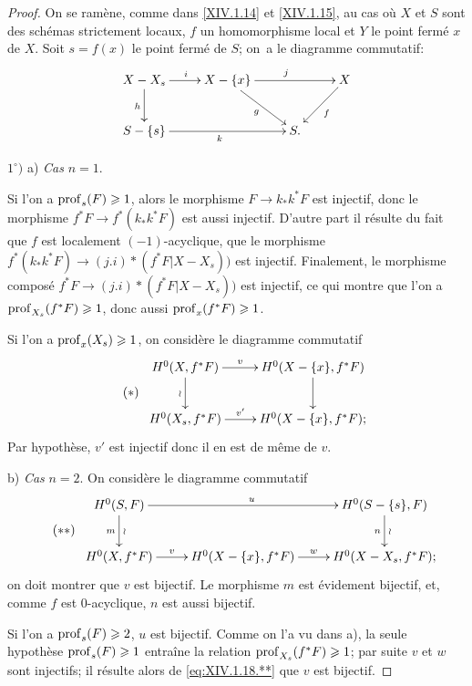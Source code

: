 \begin{proof}
On se ram\`ene, comme dans \ref{XIV.1.14} et \ref{XIV.1.15}, au cas o\`u $X$ et $S$ sont des sch\'emas strictement locaux, $f$ un homomorphisme local et $Y$ le point ferm\'e $x$ de $X$. Soit $s=f(x)$ le point ferm\'e de $S$; on~a le diagramme commutatif:
$$
\xymatrix{ X-X_s\ar[r]^i\ar[d]_h&X-\{x\}\ar[rd]_g\ar[rr]^j&&X\ar[ld]^f\\
S-\{s\}\ar[rr]_k&&S. }$$

$1^\circ)$ a) \textit{Cas} $n=1$.

Si l'on a $\operatorname{prof}_s(F)\geqslant 1$, alors le morphisme $F\to k_*k^*F$ est injectif, donc le morphisme $f^*F\to f^*(k_*k^*F)$ est aussi injectif. D'autre part il r\'esulte du fait que $f$ est localement $(-1)$-acyclique, que le morphisme $f^*(k_*k^*F)\to (j.i)*(f^*F{|X-X_s}))$ est injectif. Finalement, le morphisme compos\'e $f^*F\to (j.i)*(f^*F{|X-X_s}))$ est injectif, ce qui montre que l'on a $\operatorname{prof}_{X_s}(f^*F)\geqslant 1$, donc aussi $\operatorname{prof}_x(f^*F)\geqslant 1$.

Si l'on a $\operatorname{prof}_x(X_s)\geqslant 1$, on consid\`ere le diagramme commutatif
\begin{equation*} \label{eq:XIV.18.*} \tag{$*$}
\begin{array}{c}
\xymatrix{
H^0(X, f^*F)\ar[r]^-{v}\ar[d]_\wr&H^0(X-\{x\}, f^*F)\ar[d]\\
H^0(X_s, f^*F)\ar[r]^-{v'}&H^0(X-\{x\}, f^*F);
}
\end{array}
\end{equation*}
Par hypoth\`ese, $v'$ est injectif donc il en est de m\^eme de $v$.

b) \textit{Cas} $n=2$. On consid\`ere le diagramme commutatif
\begin{equation*} \label{eq:XIV.1.18.**} \tag{$**$}
\begin{array}{c}
\xymatrix{ H^0(S, F)\ar[d]_{m}^{\wr}\ar[rr]^u&&H^0(S-\{s\}, F)\ar[d]^{\wr}_{ n}\\
H^0(X, f^*F)\ar[r]^-v&H^0(X-\{x\}, f^*F)\ar[r]^w&H^0(X-X_s, f^*F);
}
\end{array}
\end{equation*}
on doit montrer que $v$ est bijectif. Le morphisme $m$ est \'evidement bijectif, et, comme $f$ est $0$-acyclique, $n$ est aussi bijectif.

Si l'on a $\operatorname{prof}_s(F)\geqslant 2$, $u$ est bijectif. Comme on l'a vu dans a), la seule hypoth\`ese $\operatorname{prof}_s(F)\geqslant 1$ entra\^ine la relation $\operatorname{prof}_{X_s}(f^*F)\geqslant 1$; par suite $v$ et $w$ sont injectifs; il r\'esulte alors de \eqref{eq:XIV.1.18.**} que $v$ est bijectif.


\end{proof}
